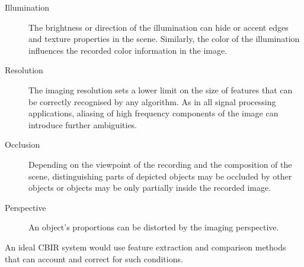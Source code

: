 \begin{description}
    \item[Illumination] The brightness or direction of the illumination can
        hide or accent edges and texture properties in the scene. Similarly,
        the color of the illumination influences the recorded color information
        in the image.
    \item[Resolution] The imaging resolution sets a lower limit on the size of
        features that can be correctly recognised by any algorithm. As in all
        signal processing applications, aliasing of high frequency components
        of the image can introduce further ambiguities.
        \autocite{shannon_communication_1998}
    \item[Occlusion] Depending on the viewpoint of the recording and the
        composition of the scene, distinguishing parts of depicted objects may
        be occluded by other objects or objects may be only partially inside
        the recorded image.
    \item[Perspective] An object's proportions can be distorted by the imaging
        perspective.
\end{description}

An ideal CBIR system would use feature extraction and comparison methods that
can account and correct for such conditions.
